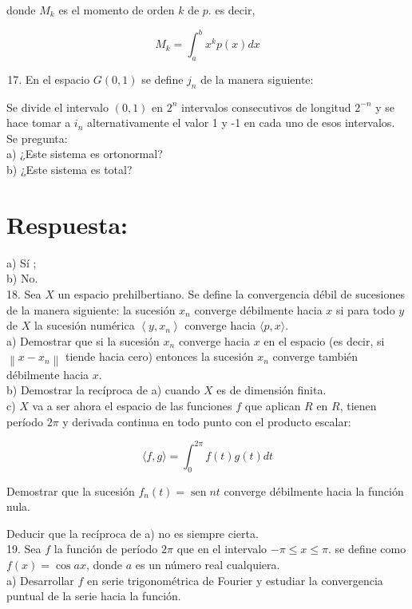 \documentclass[10pt]{article}
\theoremstyle{plain}
\theoremstyle{definition}
\theoremstyle{remark}
\begin{document}
donde $M_{k}$ es el momento de orden $k$ de $p$. es decir,

$$
M_{k}=\int_{a}^{b} x^{k} p(x) d x
$$

\begin{enumerate}
  \setcounter{enumi}{16}
  \item En el espacio $G(0,1)$ se define $j_{n}$ de la manera siguiente:
\end{enumerate}

Se divide el intervalo $(0,1)$ en $2^{n}$ intervalos consecutivos de longitud $2^{-n}$ y se hace tomar a $i_{n}$ alternativamente el valor 1 y -1 en cada uno de esos intervalos. Se pregunta:\\
a) ¿Este sistema es ortonormal?\\
b) ¿Este sistema es total?

\section*{Respuesta:}
a) Sí ;\\
b) No.\\
18. Sea $X$ un espacio prehilbertiano. Se define la convergencia débil de sucesiones de la manera siguiente: la sucesión $x_{n}$ converge débilmente hacia $x$ si para todo $y$ de $X$ la sucesión numérica $\left\langle y, x_{n}\right\rangle$ converge hacia $\langle p, x\rangle$.\\
a) Demostrar que si la sucesión $x_{n}$ converge hacia $x$ en el espacio (es decir, si $\left\|x-x_{n}\right\|$ tiende hacia cero) entonces la sucesión $x_{n}$ converge también débilmente hacia $x$.\\
b) Demostrar la recíproca de a) cuando $X$ es de dimensión finita.\\
c) $X$ va a ser ahora el espacio de las funciones $f$ que aplican $R$ en $R$, tienen período $2 \pi$ y derivada continua en todo punto con el producto escalar:

$$
\langle f, g\rangle=\int_{0}^{2 \pi} f(t) g(t) d t
$$

Demostrar que la sucesión $f_{n}(t)=\operatorname{sen} n t$ converge débilmente hacia la función nula.

Deducir que la recíproca de a) no es siempre cierta.\\
19. Sea $f$ la función de período $2 \pi$ que en el intervalo $-\pi \leqslant x \leqslant \pi$. se define como $f(x)=\cos a x$, donde $a$ es un número real cualquiera.\\
a) Desarrollar $f$ en serie trigonométrica de Fourier y estudiar la convergencia puntual de la serie hacia la función.
\end{document}

